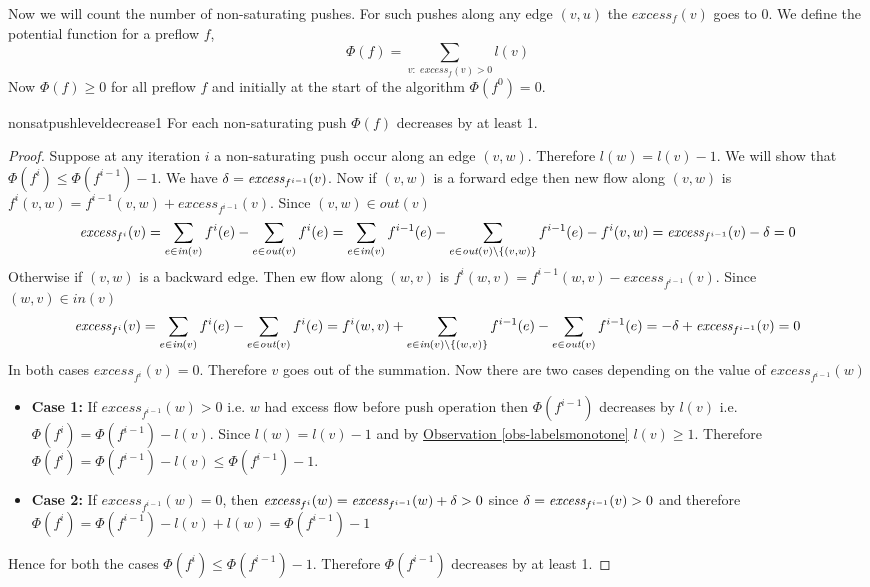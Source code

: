 Now we will count the number of non-saturating pushes. For such pushes along any edge $(v,u)$ the $\textit{excess}_f(v)$ goes to $0$. We define the potential function for a preflow $f$, $$\Phi(f)=\sum_{v:\textit{ excess}_f(v)>0}l(v)$$Now $\Phi(f)\geq 0$ for all preflow $f$ and initially at the start of the algorithm $\Phi(f^0)=0$.

\begin{lemma}{}{nonsatpushleveldecrease1}
	For each non-saturating push  $\Phi(f)$ decreases by at least 1.
\end{lemma}
\begin{proof}
	Suppose 	at any iteration $i$  a non-saturating push occur along an edge $(v,w)$. Therefore $l(w)=l(v)-1$. We will show that $\Phi(f^i)\leq \Phi(f^{i-1})-1$.		We have $\delta=\textit{excess}_{f^{i-1}}(v)$. Now if $(v,w)$ is a forward edge then new flow along $(v,w)$ is $f^i(v,w)=f^{i-1}(v,w)+\textit{excess}_{f^{i-1}}(v)$. Since $(v,w)\in \textit{out}(v)$
	$$\textit{excess}_{f^i}(v)=\sum_{e\in \textit{in}(v)}f^i(e)-\sum_{e\in \textit{out}(v)}f^i(e)=          \sum_{e\in \textit{in}(v)}f^{i-1}(e)-\sum_{e\in \textit{out}(v)\setminus\{(v,w)\}}f^{i-1}(e)-f^i(v,w)  =   \textit{excess}_{f^{i-1}}(v)-\delta=0$$ Otherwise if $(v,w)$ is a backward edge. Then  ew flow along $(w,v)$ is  $f^i(w,v)=f^{i-1}(w,v)-\textit{excess}_{f^{i-1}}(v)$. Since $(w,v)\in \textit{in}(v)$ $$\textit{excess}_{f^i}(v)=\sum_{e\in \textit{in}(v)}f^i(e)-\sum_{e\in \textit{out}(v)}f^i(e)=    f^{i}(w,v) +     \sum_{e\in \textit{in}(v)\setminus\{(w,v)\}}f^{i-1}(e)-\sum_{e\in \textit{out}(v)}f^{i-1}(e)  =  -\delta+ \textit{excess}_{f^{i-1}}(v)=0$$In both cases $\textit{excess}_{f^i}(v)=0$. Therefore 	 $v$ goes out of the summation. 		Now there are two cases depending on the value of $\textit{excess}_{f^{i-1}}(w)$\begin{itemize}[label=$\bullet$]
		\item \textbf{Case 1:}
		      If $\textit{excess}_{f^{i-1}}(w)>0$ i.e. $w$ had excess flow before push operation then $\Phi(f^{i-1})$ decreases by $l(v)$ i.e. $\Phi(f^i)=\Phi(f^{i-1})-l(v)$. Since $l(w)=l(v)-1$ and by  \hyperref[obs-labelsmonotone]{Observation \ref{obs-labelsmonotone}} $l(v)\geq 1$. Therefore $\Phi(f^i)=\Phi(f^{i-1})-l(v)\leq \Phi(f^{i-1})-1$.
		\item \textbf{Case 2:}	If $\textit{excess}_{f^{i-1}}(w)=0$, then $\textit{excess}_{f^i}(w)=\textit{excess}_{f^{i-1}}(w)+\delta>0$ since $\delta=\textit{excess}_{f^{i-1}}(v)>0$ and therefore $\Phi(f^i)=\Phi(f^{i-1})-l(v)+l(w)=\Phi(f^{i-1})-1$
	\end{itemize}
	Hence for both the cases $\Phi(f^i)\leq \Phi(f^{i-1})-1$. Therefore $\Phi(f^{i-1})$ decreases by at least 1.
\end{proof}


